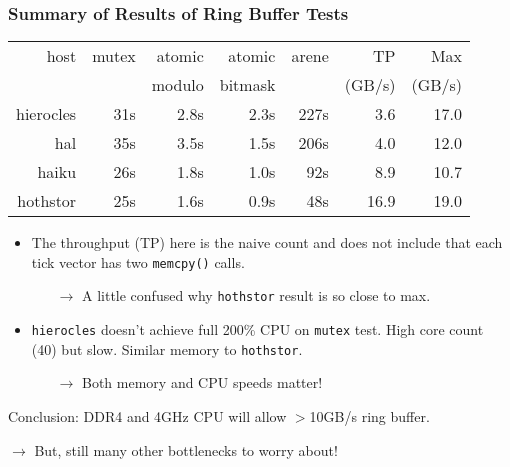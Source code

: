 \documentclass{beamer}
\begin{document}
\begin{frame}[fragile]
  \frametitle{Summary of Results of Ring Buffer Tests}
  \begin{center}
    \begin{tabular}[h]{|r||r|r|r||r|r|r|}
      \hline
      host&mutex&atomic&atomic&arene&TP     & Max \\
          &     &modulo&bitmask&    & (GB/s)& (GB/s)\\
      \hline
      hierocles & 31s & 2.8s & 2.3s & 227s & 3.6 & 17.0 \\
      hal       & 35s & 3.5s & 1.5s & 206s & 4.0 & 12.0 \\
      haiku     & 26s & 1.8s & 1.0s &  92s & 8.9 & 10.7 \\
      hothstor  & 25s & 1.6s & 0.9s &  48s & 16.9& 19.0 \\
      \hline
    \end{tabular}
  \end{center}
  \begin{itemize}
  \item The throughput (TP) here is the naive count and does not include
    that each tick vector has two \texttt{memcpy()} calls.
    \begin{itemize}\scriptsize
    \item[$\to$] A little confused why \texttt{hothstor} result is so
      close to max.
    \end{itemize}
  \item \texttt{hierocles} doesn't achieve full 200\% CPU on
    \texttt{mutex} test.  High core count (40) but slow.  Similar
    memory to \texttt{hothstor}.
    \begin{itemize}\scriptsize
    \item[$\to$] Both memory and CPU speeds matter!
    \end{itemize}
  \end{itemize}
  Conclusion: DDR4 and 4GHz CPU will allow $>$10GB/s ring buffer.

  \footnotesize
  $\to$ But, still many other bottlenecks to worry about!
\end{frame}
\end{document}
